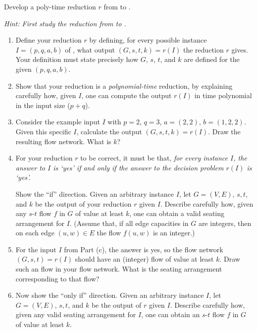 \documentclass[11pt]{article}
\begin{document}
Develop a poly-time reduction $r$ from  to .

\emph{Hint: First study the reduction from  to .}

\begin{enumerate}[label=(\alph*)]
\item 
  Define your reduction $r$
  by defining, for every possible instance $I=(p, q, a, b)$ of  ,
  what output $(G, s, t, k) = r(I)$ the reduction $r$ gives.
  Your definition must state precisely how $G$, $s$, $t$, and $k$ are defined for the given $(p, q, a, b)$.

\item
  Show that your reduction is a \emph{polynomial-time} reduction,
  by explaining carefully how, given $I$, one can compute the output $r(I)$ in time polynomial in the input size ($p+q$).

\item
  Consider the example input $I$ with $p=2$, $q=3$, $a=(2,2)$, $b=(1,2,2)$.
  Given this specific $I$, calculate the output $(G, s, t, k) = r(I)$.
  Draw the resulting flow network.  What is $k$? 

\item
For your reduction $r$ to be correct,
it must be that, \emph{for every   instance $I$,
the answer to $I$ is `\textsf{yes}' if and only if the answer to the  decision problem $r(I)$ is `\textsf{yes}'.}

Show the ``if'' direction.
Given an arbitrary  instance $I$,
let $G=(V,E)$, $s, t$, and $k$ be the output of your reduction $r$ given $I$.
Describe carefully how, given any $s$-$t$ flow $f$ in $G$ of value at least $k$,
one can obtain a valid seating arrangement for $I$.
(Assume that, if all edge capacities in $G$ are integers, then on each edge $(u,w)\in E$ the flow $f(u,w)$ is an integer.)

\item
For the input $I$ from Part (c), the answer is \textsf{yes},
so the flow network $(G, s, t)=r(I)$ should have an (integer) flow of value at least $k$.
Draw such an flow in your flow network.
What is the seating arrangement corresponding to that flow?

\item
Now show the ``only if'' direction.
Given an arbitrary  instance $I$,
let $G=(V,E)$, $s, t$, and $k$ be the output of $r$ given $I$.
Describe carefully how, given any valid seating arrangement for $I$,
one can obtain an $s$-$t$ flow $f$ in $G$ of value at least $k$.
\end{enumerate}
\end{document}
